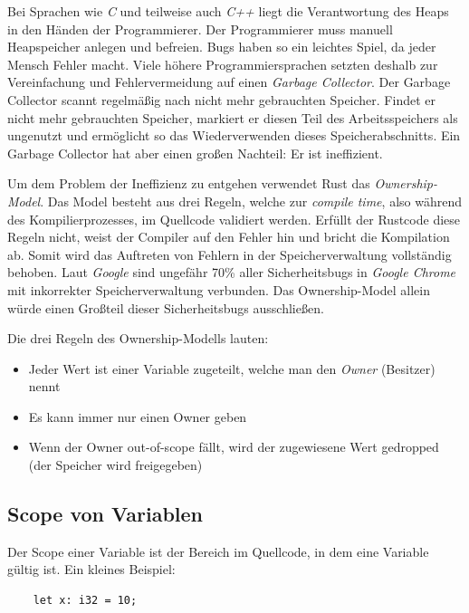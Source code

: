Bei Sprachen wie \textit{C} und teilweise auch \textit{C++} liegt die Verantwortung des Heaps in den Händen der Programmierer. Der Programmierer
muss manuell Heapspeicher anlegen und befreien. Bugs haben so ein leichtes Spiel, da jeder Mensch Fehler macht. Viele höhere Programmiersprachen setzten
deshalb zur Vereinfachung und Fehlervermeidung auf einen \textit{Garbage Collector}. Der Garbage Collector scannt regelmäßig nach nicht mehr
gebrauchten Speicher. Findet er nicht mehr gebrauchten Speicher, markiert er diesen Teil des Arbeitsspeichers als ungenutzt und ermöglicht so 
das Wiederverwenden dieses Speicherabschnitts. Ein Garbage Collector hat aber einen großen Nachteil: Er ist ineffizient.

Um dem Problem der Ineffizienz zu entgehen verwendet Rust das \textit{Ownership-Model}. Das Model besteht
aus drei Regeln, welche zur \textit{compile time}, also während des Kompilierprozesses, im Quellcode validiert werden. Erfüllt der Rustcode diese Regeln nicht,
weist der Compiler auf den Fehler hin und bricht die Kompilation ab. Somit wird das Auftreten von Fehlern in der Speicherverwaltung
vollständig behoben. Laut \textit{Google} sind ungefähr 70\% aller Sicherheitsbugs in \textit{Google Chrome} mit inkorrekter Speicherverwaltung verbunden. \cite{googlechrome70}
Das Ownership-Model allein würde einen Großteil dieser Sicherheitsbugs ausschließen.

Die drei Regeln des Ownership-Modells lauten:

\begin{itemize}
    \item Jeder Wert ist einer Variable zugeteilt, welche man den \textit{Owner} (Besitzer) nennt
    \item Es kann immer nur einen Owner geben
    \item Wenn der Owner out-of-scope fällt, wird der zugewiesene Wert gedropped (der Speicher wird freigegeben)
\end{itemize}
\cite{rustlangbookownership2}

\subsection{Scope von Variablen}
Der Scope einer Variable ist der Bereich im Quellcode, in dem eine Variable gültig ist. Ein kleines Beispiel:

\begin{lstlisting}
    let x: i32 = 10;
\end{lstlisting}

